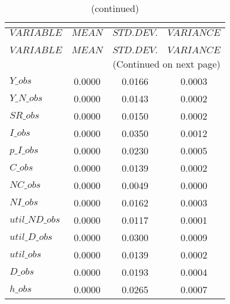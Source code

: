  
\begin{center}
\begin{longtable}{lccc} 
\caption{THEORETICAL MOMENTS}\\
 \label{Table:th_moments}\\
\toprule 
$VARIABLE       $	 & 	 $         MEAN$	 & 	 $    STD. DEV.$	 & 	 $     VARIANCE$\\
\midrule \endfirsthead 
\caption{(continued)}\\
 \toprule \\ 
$VARIABLE       $	 & 	 $         MEAN$	 & 	 $    STD. DEV.$	 & 	 $     VARIANCE$\\
\midrule \endhead 
\midrule \multicolumn{4}{r}{(Continued on next page)} \\ \bottomrule \endfoot 
\bottomrule \endlastfoot 
$Y\_obs         $	 & 	       0.0000	 & 	       0.0166	 & 	       0.0003 \\ 
$Y\_N\_obs      $	 & 	       0.0000	 & 	       0.0143	 & 	       0.0002 \\ 
$SR\_obs        $	 & 	       0.0000	 & 	       0.0150	 & 	       0.0002 \\ 
$I\_obs         $	 & 	       0.0000	 & 	       0.0350	 & 	       0.0012 \\ 
$p\_I\_obs      $	 & 	       0.0000	 & 	       0.0230	 & 	       0.0005 \\ 
$C\_obs         $	 & 	       0.0000	 & 	       0.0139	 & 	       0.0002 \\ 
$NC\_obs        $	 & 	       0.0000	 & 	       0.0049	 & 	       0.0000 \\ 
$NI\_obs        $	 & 	       0.0000	 & 	       0.0162	 & 	       0.0003 \\ 
$util\_ND\_obs  $	 & 	       0.0000	 & 	       0.0117	 & 	       0.0001 \\ 
$util\_D\_obs   $	 & 	       0.0000	 & 	       0.0300	 & 	       0.0009 \\ 
$util\_obs      $	 & 	       0.0000	 & 	       0.0139	 & 	       0.0002 \\ 
$D\_obs         $	 & 	       0.0000	 & 	       0.0193	 & 	       0.0004 \\ 
$h\_obs         $	 & 	       0.0000	 & 	       0.0265	 & 	       0.0007 \\ 
\end{longtable}
 \end{center}
